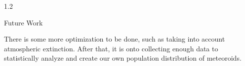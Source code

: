 \documentclass[final]{beamer}
\newlength{\twocolwid}
\begin{document}
\begin{frame}[t]
\begin{columns}[t]
\begin{column}{1.2\twocolwid}
\begin{block}{Future Work}

There is some more optimization to be done, such as taking into account atmospheric extinction. After that, it is onto collecting enough data to statistically analyze and create our own population distribution of meteoroids. 

\end{block}















\end{column}
\end{columns}
\end{frame}
\end{document}
